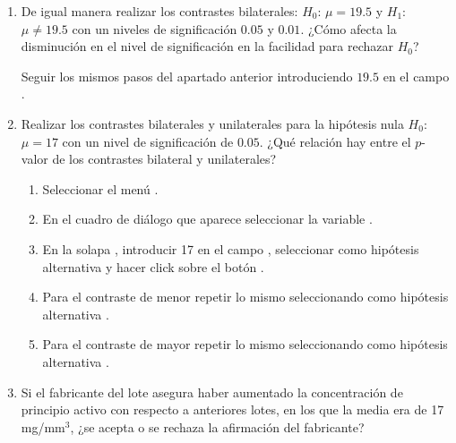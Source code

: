 \begin{enumerate}[leftmargin=*]
\begin{enumerate}
\item De igual manera realizar los contrastes bilaterales: $H_0$: $\mu=19.5$ y $H_1$: $\mu\neq19.5$ con un niveles de
significación $0.05$ y $0.01$.
¿Cómo afecta la disminución en el nivel de significación en la facilidad para rechazar $H_0$?

\begin{indicacion}{Seguir los mismos pasos del apartado anterior introduciendo $19.5$ en el campo .}
\end{indicacion}

\item Realizar los contrastes bilaterales y unilaterales para la hipótesis nula $H_0$: $\mu=17$ con un nivel de significación de $0.05$.
¿Qué relación hay entre el $p$-valor de los contrastes bilateral y unilaterales?
\begin{indicacion}{
\begin{enumerate}
\item Seleccionar el menú .
\item En el cuadro de diálogo que aparece seleccionar la variable .
\item En la solapa , introducir 17 en el campo , seleccionar como
hipótesis alternativa  y hacer click sobre el botón .
\item Para el contraste de menor repetir lo mismo seleccionando como hipótesis alternativa .
\item Para el contraste de mayor repetir lo mismo seleccionando como hipótesis alternativa .
\end{enumerate}
}
\end{indicacion}

\item Si el fabricante del lote asegura haber aumentado la concentración de principio activo con respecto a anteriores
lotes, en los que la media era de 17 mg/mm$^3$, ¿se acepta o se rechaza la afirmación del fabricante?


\end{enumerate}
\end{enumerate}
